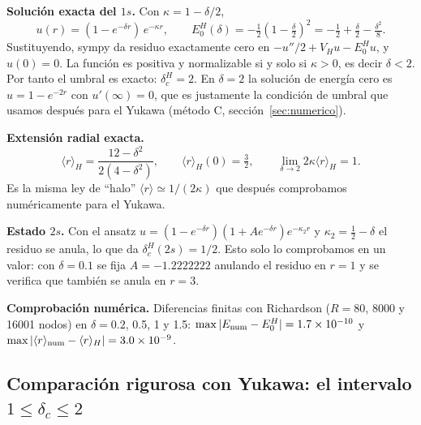 \documentclass[11pt]{article}
\newcommand{\dc}{\delta_c}
\begin{document}
\textbf{Solución exacta del $1s$.} Con $\kappa=1-\delta/2$,
\[
u(r)=(1-e^{-\delta r})\,e^{-\kappa r},\qquad E_0^H(\delta)=-\tfrac12\left(1-\tfrac{\delta}{2}\right)^2=-\tfrac12+\tfrac{\delta}{2}-\tfrac{\delta^2}{8}.
\]
Sustituyendo, sympy da residuo exactamente cero en $-u''/2+V_Hu-E_0^Hu$, y $u(0)=0$. La función es positiva y normalizable si y solo si $\kappa>0$, es decir $\delta<2$. Por tanto el umbral es exacto: $\dc^H=2$. En $\delta=2$ la solución de energía cero es $u=1-e^{-2r}$ con $u'(\infty)=0$, que es justamente la condición de umbral que usamos después para el Yukawa (método C, sección~\ref{sec:numerico}).

\textbf{Extensión radial exacta.}
\[
\langle r\rangle_H=\frac{12-\delta^2}{2(4-\delta^2)},\qquad \langle r\rangle_H(0)=\tfrac32,\qquad \lim_{\delta\to2}2\kappa\langle r\rangle_H=1 .
\]
Es la misma ley de ``halo'' $\langle r\rangle\simeq1/(2\kappa)$ que después comprobamos numéricamente para el Yukawa.

\textbf{Estado $2s$.} Con el ansatz $u=(1-e^{-\delta r})(1+Ae^{-\delta r})e^{-\kappa_2r}$ y $\kappa_2=\tfrac12-\delta$ el residuo se anula, lo que da $\dc^H(2s)=1/2$. Esto solo lo comprobamos en un valor: con $\delta=0.1$ se fija $A=-1.2222222$ anulando el residuo en $r=1$ y se verifica que también se anula en $r=3$.

\textbf{Comprobación numérica.} Diferencias finitas con Richardson ($R=80$, 8000 y 16001 nodos) en $\delta=0.2$, 0.5, 1 y 1.5: $\max|E_{\rm num}-E_0^H|=1.7\times10^{-10}$ y $\max|\langle r\rangle_{\rm num}-\langle r\rangle_H|=3.0\times10^{-9}$.

\subsection{Comparación rigurosa con Yukawa: el intervalo $1\le\dc\le2$}
\label{sec:hulthen-cota}
\end{document}
